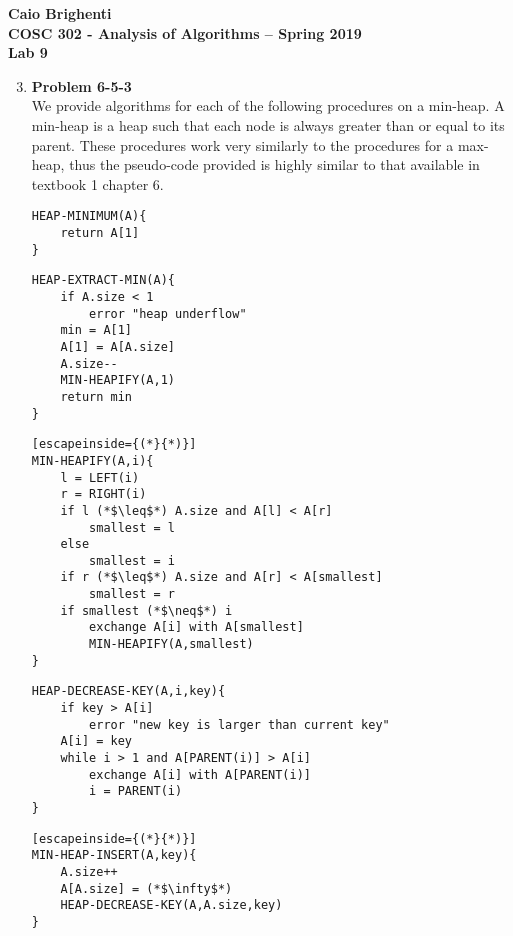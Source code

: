 \documentclass{article}
\begin{document}
\noindent \textbf{Caio Brighenti }\\
\noindent \textbf{COSC 302 - Analysis of Algorithms -- Spring 2019}\\%
\noindent \textbf{Lab 9}\vspace{1em}\\
\begin{enumerate}
	\setcounter{enumi}{2}
	\item \textbf{Problem 6-5-3}
\\ We provide algorithms for each of the following procedures on a min-heap. A min-heap is a heap such that each node is always greater than or equal to its parent. These procedures work very similarly to the procedures for a max-heap, thus the pseudo-code provided is highly similar to that available in textbook 1 chapter 6.
\begin{lstlisting}
HEAP-MINIMUM(A){
	return A[1]
}
\end{lstlisting}
\begin{lstlisting}
HEAP-EXTRACT-MIN(A){
	if A.size < 1
		error "heap underflow"
	min = A[1]
	A[1] = A[A.size]
	A.size--
	MIN-HEAPIFY(A,1)
	return min
}
\end{lstlisting}
\begin{lstlisting}[escapeinside={(*}{*)}]
MIN-HEAPIFY(A,i){
	l = LEFT(i)
	r = RIGHT(i)
	if l (*$\leq$*) A.size and A[l] < A[r]
		smallest = l
	else
		smallest = i
	if r (*$\leq$*) A.size and A[r] < A[smallest]
		smallest = r
	if smallest (*$\neq$*) i
		exchange A[i] with A[smallest]
		MIN-HEAPIFY(A,smallest)
}
\end{lstlisting}
\begin{lstlisting}
HEAP-DECREASE-KEY(A,i,key){
	if key > A[i]
		error "new key is larger than current key"
	A[i] = key
	while i > 1 and A[PARENT(i)] > A[i]
		exchange A[i] with A[PARENT(i)]
		i = PARENT(i)
}
\end{lstlisting}
\begin{lstlisting}[escapeinside={(*}{*)}]
MIN-HEAP-INSERT(A,key){
	A.size++
	A[A.size] = (*$\infty$*)
	HEAP-DECREASE-KEY(A,A.size,key)
}
\end{lstlisting}

\end{enumerate}
\end{document}
